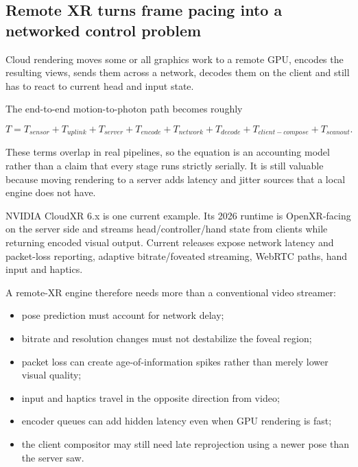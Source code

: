 \subsection{Remote XR turns frame pacing into a networked control problem}\label{06-engine-ii-ch042-remote-xr-turns-frame-pacing-into-a-networked-control-problem}

\hypertarget{06-engine-ii-ch042-remote-xr-turns-frame-pacing-into-a-networked-control-problem}{}

Cloud rendering moves some or all graphics work to a remote GPU, encodes the resulting views, sends them across a network, decodes them on the client and still has to react to current head and input state.

The end-to-end motion-to-photon path becomes roughly

\[
T =
T_{sensor}
+T_{uplink}
+T_{server}
+T_{encode}
+T_{network}
+T_{decode}
+T_{client-compose}
+T_{scanout}.
\]

These terms overlap in real pipelines, so the equation is an accounting model rather than a claim that every stage runs strictly serially. It is still valuable because moving rendering to a server adds latency and jitter sources that a local engine does not have.

NVIDIA CloudXR 6.x is one current example. Its 2026 runtime is OpenXR-facing on the server side and streams head/controller/hand state from clients while returning encoded visual output. Current releases expose network latency and packet-loss reporting, adaptive bitrate/foveated streaming, WebRTC paths, hand input and haptics.

A remote-XR engine therefore needs more than a conventional video streamer:

\begin{itemize}
\tightlist
\item
  pose prediction must account for network delay;
\item
  bitrate and resolution changes must not destabilize the foveal region;
\item
  packet loss can create age-of-information spikes rather than merely lower visual quality;
\item
  input and haptics travel in the opposite direction from video;
\item
  encoder queues can add hidden latency even when GPU rendering is fast;
\item
  the client compositor may still need late reprojection using a newer pose than the server saw.
\end{itemize}

